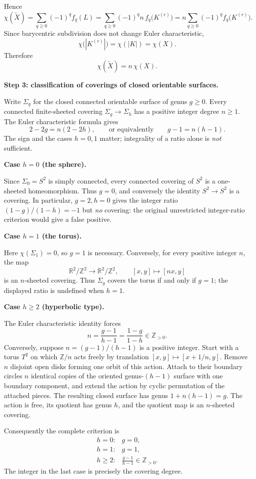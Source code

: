 \begin{solution}
Hence
\[
\chi(\widetilde X)
=\sum_{q\ge 0}(-1)^q f_q(L)
=\sum_{q\ge 0}(-1)^q n\,f_q\bigl(K^{(r)}\bigr)
=n\sum_{q\ge 0}(-1)^q f_q\bigl(K^{(r)}\bigr).
\]
Since barycentric subdivision does not change Euler characteristic,
\[
\chi\bigl(|K^{(r)}|\bigr)=\chi(|K|)=\chi(X).
\]
Therefore
\[
\boxed{\chi(\widetilde X)=n\,\chi(X).}
\]

\par

\textbf{Step 3: classification of coverings of closed orientable surfaces.}

Write \(\Sigma_g\) for the closed connected orientable surface of genus
\(g\ge 0\). Every connected finite-sheeted covering
\(\Sigma_g\to\Sigma_h\) has a positive integer degree \(n\ge1\).
The Euler characteristic formula gives
\[
2-2g=n(2-2h),\qquad \text{or equivalently}\qquad
 g-1=n(h-1).
\]
The sign and the cases \(h=0,1\) matter; integrality of a ratio
alone is \emph{not} sufficient.

\medskip
\noindent\textbf{Case \(h=0\) (the sphere).}\par\smallskip
Since \(\Sigma_0=S^2\) is simply connected, every connected covering
of \(S^2\) is a one-sheeted homeomorphism. Thus \(g=0\), and
conversely the identity \(S^2\to S^2\) is a covering. In particular,
\(g=2,h=0\) gives the integer ratio \((1-g)/(1-h)=-1\) but
\emph{no} covering: the original unrestricted integer-ratio criterion
would give a false positive.

\medskip
\noindent\textbf{Case \(h=1\) (the torus).}\par\smallskip
Here \(\chi(\Sigma_1)=0\), so \(g=1\) is necessary.
Conversely, for every positive integer \(n\), the map
\[
\mathbb R^2/\mathbb Z^2\longrightarrow\mathbb R^2/\mathbb Z^2,
\qquad [x,y]\longmapsto[nx,y]
\]
is an \(n\)-sheeted covering. Thus \(\Sigma_g\) covers the torus
if and only if \(g=1\); the displayed ratio is undefined when
\(h=1\).

\medskip
\noindent\textbf{Case \(h\ge2\) (hyperbolic type).}\par\smallskip
The Euler characteristic identity forces
\[
n=\frac{g-1}{h-1}=\frac{1-g}{1-h}\in\mathbb Z_{>0}.
\]
Conversely, suppose \(n=(g-1)/(h-1)\) is a positive integer.
Start with a torus \(T^2\) on which \(\mathbb Z/n\) acts freely by
translation \([x,y]\mapsto[x+1/n,y]\). Remove \(n\) disjoint
open disks forming one orbit of this action. Attach to their boundary
circles \(n\) identical copies of the oriented genus-\((h-1)\)
surface with one boundary component, and extend the action by cyclic
permutation of the attached pieces. The resulting closed surface has
genus \(1+n(h-1)=g\). The action is free, its quotient has genus \(h\),
and the quotient map is an \(n\)-sheeted covering.

Consequently the complete criterion is
\[
\boxed{\begin{array}{ll}
 h=0:&g=0,\\[1mm]
 h=1:&g=1,\\[1mm]
 h\ge2:&\displaystyle\frac{g-1}{h-1}\in\mathbb Z_{>0}.
\end{array}}
\]
The integer in the last case is precisely the covering degree.
\end{solution}

